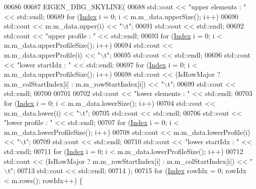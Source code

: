 \begin{DoxyCode}
00686 
00687         EIGEN\_DBG\_SKYLINE(
00688         std::cout << \textcolor{stringliteral}{"upper elements : "} << std::endl;
00689         \textcolor{keywordflow}{for} (\hyperlink{group___core___module_a554f30542cc2316add4b1ea0a492ff02}{Index} i = 0; i < m.m\_data.upperSize(); i++)
00690             std::cout << m.m\_data.upper(i) << \textcolor{stringliteral}{"\(\backslash\)t"};
00691         std::cout << std::endl;
00692         std::cout << \textcolor{stringliteral}{"upper profile : "} << std::endl;
00693         \textcolor{keywordflow}{for} (\hyperlink{group___core___module_a554f30542cc2316add4b1ea0a492ff02}{Index} i = 0; i < m.m\_data.upperProfileSize(); i++)
00694             std::cout << m.m\_data.upperProfile(i) << \textcolor{stringliteral}{"\(\backslash\)t"};
00695         std::cout << std::endl;
00696         std::cout << \textcolor{stringliteral}{"lower startIdx : "} << std::endl;
00697         \textcolor{keywordflow}{for} (\hyperlink{group___core___module_a554f30542cc2316add4b1ea0a492ff02}{Index} i = 0; i < m.m\_data.upperProfileSize(); i++)
00698             std::cout << (IsRowMajor ? m.m\_colStartIndex[i] : m.m\_rowStartIndex[i]) << \textcolor{stringliteral}{"\(\backslash\)t"};
00699         std::cout << std::endl;
00700 
00701 
00702         std::cout << \textcolor{stringliteral}{"lower elements : "} << std::endl;
00703         \textcolor{keywordflow}{for} (\hyperlink{group___core___module_a554f30542cc2316add4b1ea0a492ff02}{Index} i = 0; i < m.m\_data.lowerSize(); i++)
00704             std::cout << m.m\_data.lower(i) << \textcolor{stringliteral}{"\(\backslash\)t"};
00705         std::cout << std::endl;
00706         std::cout << \textcolor{stringliteral}{"lower profile : "} << std::endl;
00707         \textcolor{keywordflow}{for} (\hyperlink{group___core___module_a554f30542cc2316add4b1ea0a492ff02}{Index} i = 0; i < m.m\_data.lowerProfileSize(); i++)
00708             std::cout << m.m\_data.lowerProfile(i) << \textcolor{stringliteral}{"\(\backslash\)t"};
00709         std::cout << std::endl;
00710         std::cout << \textcolor{stringliteral}{"lower startIdx : "} << std::endl;
00711         \textcolor{keywordflow}{for} (\hyperlink{group___core___module_a554f30542cc2316add4b1ea0a492ff02}{Index} i = 0; i < m.m\_data.lowerProfileSize(); i++)
00712             std::cout << (IsRowMajor ? m.m\_rowStartIndex[i] : m.m\_colStartIndex[i]) << \textcolor{stringliteral}{"\(\backslash\)t"};
00713         std::cout << std::endl;
00714         );
00715         \textcolor{keywordflow}{for} (\hyperlink{group___core___module_a554f30542cc2316add4b1ea0a492ff02}{Index} rowIdx = 0; rowIdx < m.rows(); rowIdx++) \{

\end{DoxyCode}
